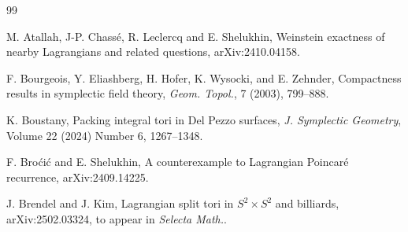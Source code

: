 \documentclass[12pt]{amsart}
\theoremstyle{definition}
\begin{document}
    
\clearpage

\begin{thebibliography} {99}

 M. Atallah, J-P. Chass\'{e}, R. Leclercq and E. Shelukhin, Weinstein exactness of nearby Lagrangians and related questions, arXiv:2410.04158.



F. Bourgeois, Y. Eliashberg, H. Hofer, K. Wysocki, and E. Zehnder,
 Compactness results in symplectic field theory,
{\em Geom. Topol.}, 7 (2003), 799--888.


 K. Boustany, Packing integral tori in Del Pezzo surfaces, {\em J. Symplectic Geometry}, 
Volume 22 (2024) Number 6, 1267--1348.


 F. Bro\'ci\'c and E. Shelukhin, A counterexample to Lagrangian Poincar\'e recurrence, arXiv:2409.14225.

 J. Brendel and J. Kim, Lagrangian split tori in $S^2 \times S^2$ and billiards,  arXiv:2502.03324, to appear in {\em Selecta Math.}.







\end{thebibliography}
\end{document}
